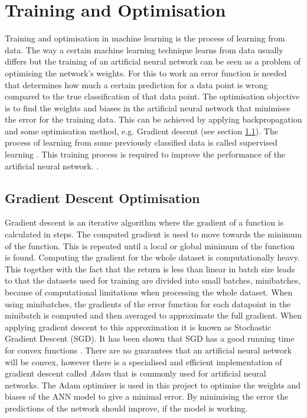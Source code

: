 \section{Training and Optimisation} \label{sec:trainingoptimisation}
Training and optimisation in machine learning is the process of learning from data. The way a certain machine learning technique learns from data usually differs but the training of an artificial neural network can be seen as a problem of optimising the network's weights. For this to work an error function is needed that determines how much a certain prediction for a data point is wrong compared to the true classification of that data point. The optimisation objective is to find the weights and biases in the artificial neural network that minimises the error for the training data. This can be achieved by applying backpropagation and some optimisation method, e.g. Gradient descent (see section \ref{sec:gradient_descent}). The process of learning from some previously classified data is called supervised learning \parencite{lecun2015deep}. This training process is required to improve the performance of  the artificial neural network. \parencite{Goodfellow-et-al-2016}.

\subsection{Gradient Descent Optimisation}\label{sec:gradient_descent}
Gradient descent is an iterative algorithm where the gradient of a function is calculated in steps. The computed gradient is used to move towards the minimum of the function. This is repeated until a local or global minimum of the function is found. Computing the gradient for the whole dataset is computationally heavy. This together with the fact that the return is less than linear in batch size \parencite{Goodfellow-et-al-2016} leads to that the datasets used for training are divided into small batches, minibatches, because of computational limitations when processing the whole dataset. When using minibatches, the gradients of the error function for each datapoint in the minibatch is computed and then averaged to approximate the full gradient. When applying gradient descent to this approximation it is known as Stochastic Gradient Descent (SGD). It has been shown that SGD has a good running time for convex functions \parencite{convexSGD}. There are no guarantees that an artificial neural network will be convex, however there is a specialised and efficient implementation of gradient descent called \textit{Adam} \parencite{adamoptimizer} that is commonly used for artificial neural networks. The Adam optimiser is used in this project to optimise the weights and biases of the ANN model to give a minimal error. By minimising the error the predictions of the network should improve, if the model is working.


